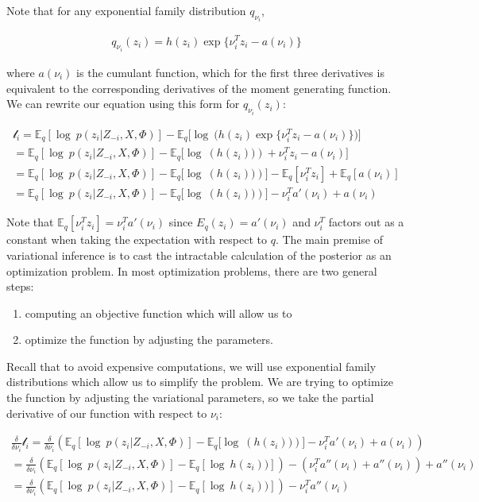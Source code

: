 Note that for any exponential family distribution $q_{\nu_i}$, 

\begin{align} q_{\nu_i}(z_i) = h(z_i) \exp \big\{ \nu_i^{T} z_i - a(\nu_i) \big\} \end{align}

where $a(\nu_i)$ is the cumulant function, which for the first three derivatives is equivalent to the corresponding derivatives of the moment generating function. We can rewrite our equation using this form for $q_{\nu_i}(z_i)$:


\begin{align} 
\nonumber \mathcal{l}_i = \mathbb{E}_q[\log\ p(z_i| Z_{-i}, X, \Phi)] - \mathbb{E}_q\bigg[\log\ \Big( h(z_i) \exp \big\{ \nu_i^{T} z_i - a(\nu_i) \big\} \Big) \bigg] \\
\nonumber = \mathbb{E}_q[\log\ p(z_i| Z_{-i}, X, \Phi)] -  \mathbb{E}_q\bigg[\log\ \left( h(z_i))\right) + \nu_i^{T} z_i - a(\nu_i) \bigg] \\
\nonumber = \mathbb{E}_q[\log\ p(z_i| Z_{-i}, X, \Phi)] -  \mathbb{E}_q\big[\log\ \left( h(z_i))\right)\big] - \mathbb{E}_q[\nu_i^T z_i]  + \mathbb{E}_q[a(\nu_i)] \\
= \mathbb{E}_q[\log\ p(z_i| Z_{-i}, X, \Phi)] -  \mathbb{E}_q\big[\log\ \left( h(z_i))\right)\big] - \nu_i^T a'(\nu_i) + a(\nu_i)
\end{align} 


Note that $\mathbb{E}_q[\nu_i^Tz_i] = \nu_i^T a'(\nu_i)$ since $E_q(z_i) = a'(\nu_i)$ and $\nu_i^T$ factors out as a constant when taking the expectation with respect to $q$. The main premise of variational inference is to cast the intractable calculation of the posterior as an optimization problem. In most optimization problems, there are two general steps: 
\begin{enumerate}
    \item computing an objective function which will allow us to 
    \item optimize the function by adjusting the parameters. 
\end{enumerate} 

Recall that to avoid expensive computations, we will use exponential family distributions which allow us to simplify the problem. We are trying to optimize the function by adjusting the variational parameters, so we take the partial derivative of our function with respect to $\nu_i$: 

\begin{align}
\nonumber \frac{\delta}{\delta \nu_i} \mathcal{l}_i = \frac{\delta}{\delta \nu_i} \left( \mathbb{E}_q[\log\ p(z_i| Z_{-i}, X, \Phi)] -  \mathbb{E}_q\big[\log\ \left( h(z_i))\right)\big] - \nu_i^T a'(\nu_i) + a(\nu_i) \right) \\
\nonumber = \frac{\delta}{\delta \nu_i} \left( \mathbb{E}_q[\log\ p(z_i| Z_{-i}, X, \Phi)] -  \mathbb{E}_q[\log\ h(z_i))] \right) - \left(\nu_i^Ta''(\nu_i)  + a''(\nu_i)\right) + a''(\nu_i) \\
= \frac{\delta}{\delta \nu_i} \left( \mathbb{E}_q[\log\ p(z_i| Z_{-i}, X, \Phi)] -  \mathbb{E}_q[\log\ h(z_i))] \right) - \nu_i^Ta''(\nu_i)
\end{align}


